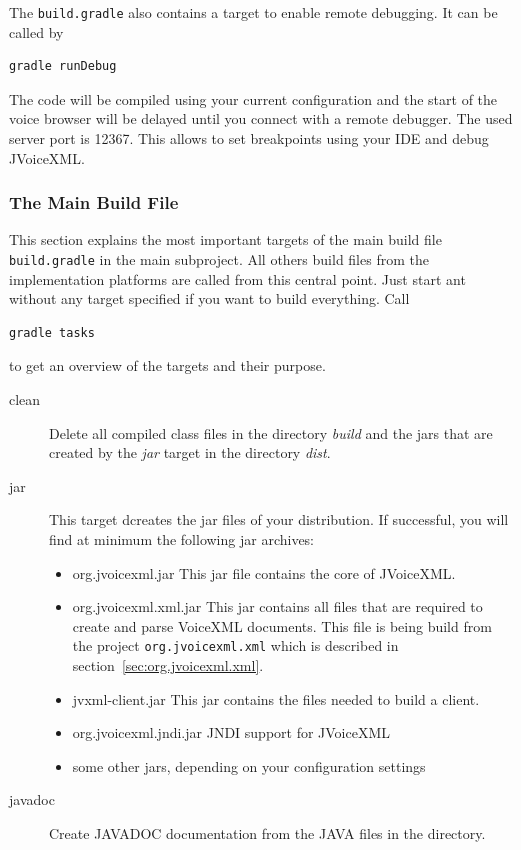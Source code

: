 \documentclass[11pt,a4paper]{article}
\begin{document}
The \texttt{build.gradle} also contains a target to enable remote
debugging. It can be called by
\begin{lstlisting}
gradle runDebug
\end{lstlisting}
The code will be compiled using your current configuration and the start of the
voice browser will be delayed until you connect with a remote debugger. The
used server port is 12367. This allows to set breakpoints using your IDE and
debug JVoiceXML.

\subsubsection{The Main Build File}
\label{sec:main-build-file}

This section explains the most important targets of the main build file
\texttt{build.gradle} in the main subproject. All others build files from the
implementation platforms
are called from this central point. Just start ant without any target specified
if you want to build everything. Call
\begin{lstlisting}
gradle tasks
\end{lstlisting}
to get an overview of the targets and their purpose.

\begin{description}
\item[clean]
Delete all compiled class files in the directory \emph{build}
and the jars that are created by the \emph{jar} target in the directory 
\emph{dist}.

\item[jar]
This target dcreates the jar files of your distribution.
If successful, you will find at minimum the following jar archives:
\begin{itemize}
\item org.jvoicexml.jar This jar file contains the core of JVoiceXML.
\item org.jvoicexml.xml.jar This jar contains all files that are required
to create and parse VoiceXML documents. This file is being build from the
project \texttt{org.jvoicexml.xml} which is described in
section~\ref{sec:org.jvoicexml.xml}.
\item jvxml-client.jar This jar contains the files needed to build
a client.
\item org.jvoicexml.jndi.jar JNDI support for JVoiceXML
\item some other jars, depending on your configuration settings
\end{itemize}

\item[javadoc]
Create JAVADOC documentation from the JAVA files in the directory.
\end{description}
\end{document}
